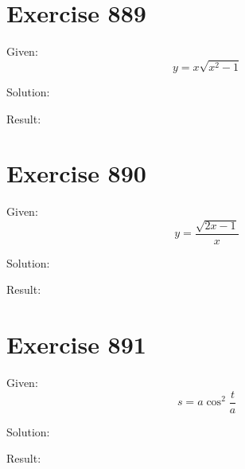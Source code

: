 \documentclass[a4paper, 10pt]{scrartcl}
\begin{document}
\section{Exercise 889}

Given:
\[
y = x\sqrt{x^{2} - 1}
\]

Solution:

Result:

\section{Exercise 890}

Given:
\[
y = \frac{\sqrt{2x - 1}}{x}
\]

Solution:

Result:

\section{Exercise 891}

Given:
\[
s = a\cos^{2}{\frac{t}{a}}
\]

Solution:

Result:
\end{document}
